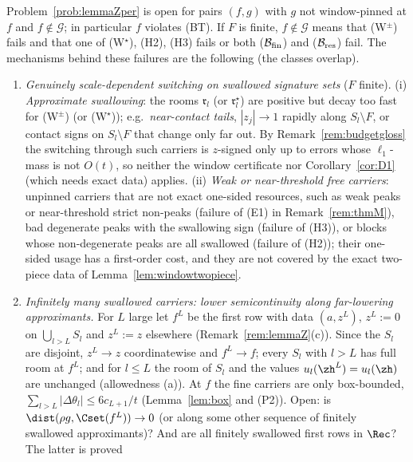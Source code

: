 \begin{remark}\label{rem:openZ}
Problem~\ref{prob:lemmaZper} is open for pairs $(f,g)$ with $g$ not
window-pinned at $f$ and $f\notin\mathcal G$; in particular $f$ violates
\textup{(BT)}.  If $F$ is finite, $f\notin\mathcal G$ means that
\textup{(W$^\pm$)} fails and that one of \textup{(W$^\star$)},
\textup{(H2)}, \textup{(H3)} fails or both \textup{($\mathcal B_{\rm
fin}$)} and \textup{($\mathcal B_{\rm res}$)} fail.  The mechanisms behind
these failures are the following (the classes overlap).
\begin{enumerate}
\item[(O1)] \emph{Genuinely scale-dependent switching on swallowed
signature sets} ($F$ finite).  (i) \emph{Approximate swallowing}: the
rooms $\mathfrak r_l$ (or $\mathfrak r^\star_l$) are positive but decay too
fast for (W$^\pm$) (or (W$^\star$)); e.g.\ \emph{near-contact tails},
$|z_j|\to1$ rapidly along $S_l\setminus F$, or contact signs on $S_l
\setminus F$ that change only far out.  By Remark~\ref{rem:budgetgloss} the
switching through such carriers is $z$-signed only up to errors whose
$\ell_1$-mass is not $O(t)$, so neither the window certificate nor
Corollary~\ref{cor:D1} (which needs exact data) applies.  (ii) \emph{Weak
or near-threshold free carriers}: unpinned carriers that are not exact
one-sided resources, such as weak peaks or near-threshold strict non-peaks
(failure of (E1) in Remark~\ref{rem:thmM}), bad degenerate peaks with the
swallowing sign (failure of (H3)), or blocks whose non-degenerate peaks
are all swallowed (failure of (H2)); their one-sided usage has a
first-order cost, and they are not covered by the exact two-piece data of
Lemma~\ref{lem:windowtwopiece}.
\item[(O2)] \emph{Infinitely many swallowed carriers: lower
semicontinuity along far-lowering approximants.}  For $L$ large let $f^L$
be the first row with data $(a,z^L)$, $z^L:=0$ on $\bigcup_{l>L}S_l$ and
$z^L:=z$ elsewhere (Remark~\ref{rem:lemmaZ}(c)).  Since the $S_l$ are
disjoint, $z^L\to z$ coordinatewise and $f^L\to f$; every $S_l$ with $l>L$
has full room at $f^L$; and for $l\le L$ the room of $S_l$ and the values
$u_l(\zh^L)=u_l(\zh)$ are unchanged (allowedness (a)).  At $f$ the fine
carriers are only box-bounded, $\sum_{l>L}|\Delta\theta_l|\le6c_{L+1}/t$
(Lemma~\ref{lem:box} and (P2)).  Open: is $\dist(\rho g,\Cset(f^L))\to0$
(or along some other sequence of finitely swallowed approximants)?  And
are all finitely swallowed first rows in $\Rec$?  The latter is proved

\end{enumerate}
\end{remark}
